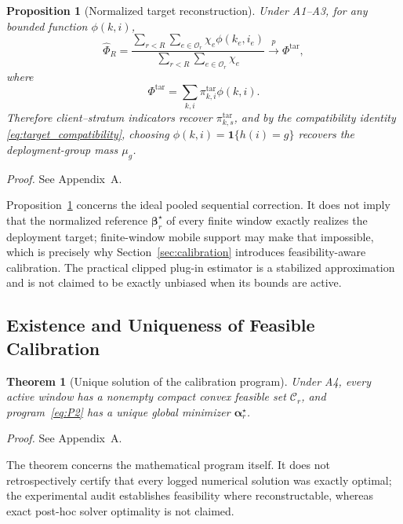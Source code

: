 \documentclass[letterpaper,journal]{IEEEtran}
\newtheorem{theorem}{Theorem}
\newtheorem{proposition}{Proposition}
\begin{document}
\begin{proposition}[Normalized target reconstruction]
\label{prop:reconstruction}
Under A1--A3, for any bounded function $\phi(k,i)$,
\begin{equation}
 \widehat\Phi_R
 =
 \frac{
 \sum_{r<R}
 \sum_{e\in\mathcal{O}_r}
 \chi_e\phi(k_e,i_e)
 }{
 \sum_{r<R}
 \sum_{e\in\mathcal{O}_r}
 \chi_e
 }
 \xrightarrow{p}
 \Phi^{\mathrm{tar}},
 \label{eq:hajek_phi}
\end{equation}
where
\begin{equation}
 \Phi^{\mathrm{tar}}
 =
 \sum_{k,i}
 \pi^{\mathrm{tar}}_{k,i}\phi(k,i).
 \label{eq:target_phi}
\end{equation}
Therefore client--stratum indicators recover
$\pi^{\mathrm{tar}}_{k,s}$, and by the compatibility identity
\eqref{eq:target_compatibility}, choosing
$\phi(k,i)=\mathbf{1}\{h(i)=g\}$ recovers the deployment-group mass
$\mu_g$.
\end{proposition}

\noindent\emph{Proof.}
See Appendix~A.

Proposition~\ref{prop:reconstruction} concerns the ideal pooled sequential correction.  It does not
imply that the normalized reference $\boldsymbol\beta_r^\star$ of every finite
window exactly realizes the deployment target; finite-window mobile support may
make that impossible, which is precisely why Section~\ref{sec:calibration}
introduces feasibility-aware calibration.  The practical clipped plug-in
estimator is a stabilized approximation and is not claimed to be exactly
unbiased when its bounds are active.

\subsection{Existence and Uniqueness of Feasible Calibration}
\label{subsec:theorem_calibration}

\begin{theorem}[Unique solution of the calibration program]
\label{thm:calibration}
Under A4, every active window has a nonempty compact convex feasible set
$\mathcal{C}_r$, and program~\eqref{eq:P2} has a unique global minimizer
$\boldsymbol\alpha_r^\star$.
\end{theorem}

\noindent\emph{Proof.}
See Appendix~A.

The theorem concerns the mathematical program itself.  It does not
retrospectively certify that every logged numerical solution was exactly
optimal; the experimental audit establishes feasibility where reconstructable,
whereas exact post-hoc solver optimality is not claimed.
\end{document}
